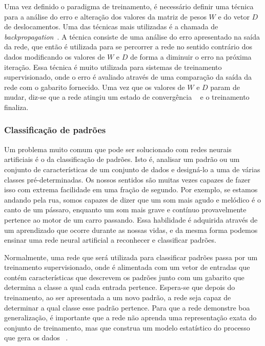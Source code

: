 Uma vez definido o paradigma de treinamento, é necessário definir uma técnica para a análise do erro e alteração dos valores da matriz de pesos $W$ e do vetor $D$ de deslocamentos. Uma das técnicas mais utilizadas é a chamada de \textit{backpropagation}~\cite{DeepLearning, ZhangNNSurvey}. A técnica consiste de uma análise do erro apresentado na saída da rede, que então é utilizada para se percorrer a rede no sentido contrário dos dados modificando os valores de $W$ e $D$ de forma a diminuir o erro na próxima iteração. Essa técnica é muito utilizada para sistemas de treinamento supervisionado, onde o erro é avaliado através de uma comparação da saída da rede com o gabarito fornecido. Uma vez que os valores de $W$ e $D$ param de mudar, diz-se que a rede atingiu um estado de convergência ~\cite{Kosabov} e o treinamento finaliza.


\subsubsection{Classificação de padrões}




Um problema muito comum que pode ser solucionado com redes neurais artificiais é o da classificação de padrões. Isto é, analisar um padrão ou um conjunto de características de um conjunto de dados e designá-lo a uma de várias classes pré-determinadas. Os nossos sentidos são muitas vezes capazes de fazer isso com extrema facilidade em uma fração de segundo. Por exemplo, se estamos andando pela rua, somos capazes de dizer que um som mais agudo e melódico é o canto de um pássaro, enquanto um som mais grave e contínuo provavelmente pertence ao motor de um carro passando. Essa habilidade é adquirida através de um aprendizado que ocorre durante as nossas vidas, e da mesma forma podemos ensinar uma rede neural artificial a reconhecer e classificar padrões.

Normalmente, uma rede que será utilizada para classificar padrões passa por um treinamento supervisionado, onde é alimentada com um vetor de entradas que contém características que descrevem os padrões junto com um gabarito que determina a classe a qual cada entrada pertence. Espera-se que depois do treinamento, ao ser apresentada a um novo padrão, a rede seja capaz de determinar a qual classe esse padrão pertence. Para que a rede demonstre boa generalização, é importante que a rede não aprenda uma representação exata do conjunto de treinamento, mas que construa um modelo estatístico do processo que gera os dados ~\cite{NNForPR}.

